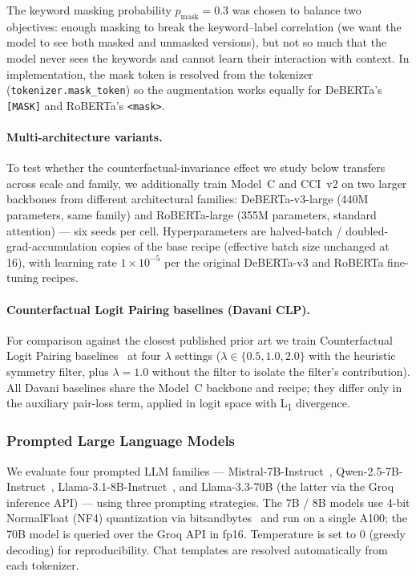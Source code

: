 The keyword masking probability $p_{\text{mask}} = 0.3$ was chosen to balance two objectives: enough masking to break the keyword--label correlation (we want the model to see both masked and unmasked versions), but not so much that the model never sees the keywords and cannot learn their interaction with context. In implementation, the mask token is resolved from the tokenizer (\texttt{tokenizer.mask\_token}) so the augmentation works equally for DeBERTa's \texttt{[MASK]} and RoBERTa's \texttt{<mask>}.

\paragraph{Multi-architecture variants.}
To test whether the counterfactual-invariance effect we study below transfers across scale and family, we additionally train Model~C and CCI~v2 on two larger backbones from different architectural families: DeBERTa-v3-large (440M parameters, same family) and RoBERTa-large (355M parameters, standard attention) --- six seeds per cell. Hyperparameters are halved-batch / doubled-grad-accumulation copies of the base recipe (effective batch size unchanged at 16), with learning rate $1 \times 10^{-5}$ per the original DeBERTa-v3 and RoBERTa fine-tuning recipes.

\paragraph{Counterfactual Logit Pairing baselines (Davani CLP).}
For comparison against the closest published prior art we train Counterfactual Logit Pairing baselines~\citep{garg2019counterfactual,davani2021improving} at four $\lambda$ settings ($\lambda \in \{0.5, 1.0, 2.0\}$ with the heuristic symmetry filter, plus $\lambda = 1.0$ without the filter to isolate the filter's contribution). All Davani baselines share the Model~C backbone and recipe; they differ only in the auxiliary pair-loss term, applied in logit space with L\textsubscript{1} divergence.

\subsubsection{Prompted Large Language Models}

We evaluate four prompted LLM families --- Mistral-7B-Instruct~\citep{jiang2023mistral}, Qwen-2.5-7B-Instruct~\citep{qwen25}, Llama-3.1-8B-Instruct~\citep{llama31}, and Llama-3.3-70B (the latter via the Groq inference API) --- using three prompting strategies. The 7B / 8B models use 4-bit NormalFloat (NF4) quantization via bitsandbytes~\citep{dettmers2022gptint} and run on a single A100; the 70B model is queried over the Groq API in fp16. Temperature is set to 0 (greedy decoding) for reproducibility. Chat templates are resolved automatically from each tokenizer.

